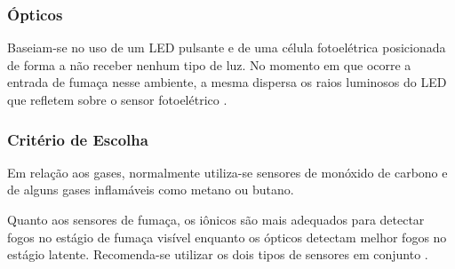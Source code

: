\subsubsection{Ópticos}
Baseiam-se no uso de um LED pulsante e de uma célula fotoelétrica posicionada de forma a não receber nenhum
tipo de luz. No momento em que ocorre a entrada de fumaça nesse ambiente, a mesma dispersa os raios luminosos do
LED que refletem sobre o sensor fotoelétrico \cite{thomazini_albuquerque2005}.

\subsubsection{Critério de Escolha}
Em relação aos gases, normalmente utiliza-se sensores de monóxido de carbono e de alguns gases inflamáveis como
metano ou butano.

Quanto aos sensores de fumaça, os iônicos são mais adequados para detectar fogos no estágio de fumaça visível
enquanto os ópticos detectam melhor fogos no estágio latente. Recomenda-se utilizar os dois tipos de sensores
em conjunto \cite{sinclair2001}.

